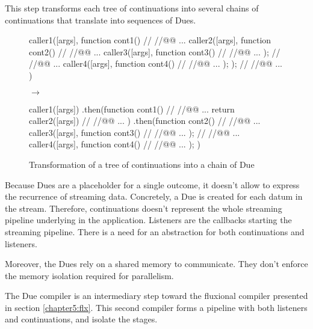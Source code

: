 This step transforms each tree of continuations into several chains of continuations that translate into sequences of Dues.

\begin{figure}[h!]
    \begin{minipage}{0.42\textwidth}
      \centering
      \begin{code}[js, caption={Nested calls of continuations},label={lst:nest-cint}]%
caller1([args], function cont1(){
  // //@@ ...
  caller2([args], function cont2(){
    // //@@ ...
    caller3([args], function cont3(){
      // //@@ ...
    });
    // //@@ ...
    caller4([args], function cont4(){
      // //@@ ...
    });
  });
  // //@@ ...
})\end{code}
    \end{minipage}
    \hfill
    $\to$
    \hfill
    \begin{minipage}{0.42\textwidth}
      \centering
      \begin{code}[js, caption={Chain of Due},label={lst:nest-cint}]%
caller1([args])
.then(function cont1(){
  // //@@ ...
  return caller2([args])
  // //@@ ...
})
.then(function cont2(){
  // //@@ ...
  caller3([args], function cont3(){
    // //@@ ...
  });
  // //@@ ...
  caller4([args], function cont4(){
    // //@@ ...
  });
})\end{code}
    \end{minipage}
    \caption{Transformation of a tree of continuations into a chain of Due}
    \label{fig:tree-to-chain}
\end{figure}


\separator


Because Dues are a placeholder for a single outcome, it doesn't allow to express the recurrence of streaming data.
Concretely, %
a Due is created for each datum in the stream.
Therefore, continuations doesn't represent the whole streaming pipeline underlying in the application.
Listeners are the callbacks starting the streaming pipeline.
There is a need for an abstraction for both continuations and listeners.

Moreover, the Dues rely on a shared memory to communicate.
They don't enforce the memory isolation required for parallelism.

The Due compiler is an intermediary step toward the fluxional compiler presented in section \ref{chapter5:flx}.
This second compiler forms a pipeline with both listeners and continuations, and isolate the stages.
